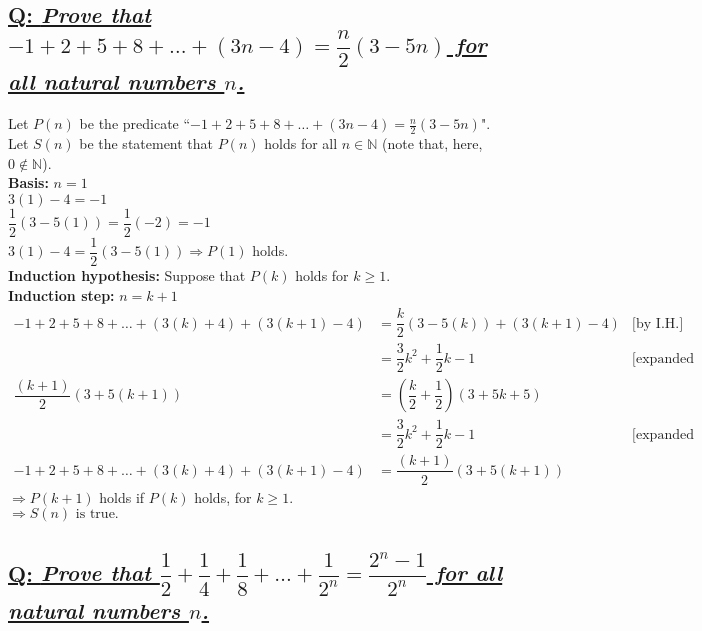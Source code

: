 \documentclass{article}
\begin{document}
\subsection*{\href{http://www.youtube.com/watch?v=wBvsIyQN4o8}{Q: {\em Prove that $-1+2+5+8+\ldots+(3n-4)=\dfrac{n}{2}(3-5n)$ for all natural numbers $n$.}}}

Let $P(n)$ be the predicate ``$-1+2+5+8+\ldots+(3n-4)=\tfrac{n}{2}(3-5n)$".\\
Let $S(n)$ be the statement that $P(n)$ holds for all $n\in\mathbb{N}$ (note that, here, $0\notin\mathbb{N}$).\\[1ex]
\textbf{Basis:} $n=1$\\[1ex]
$3(1)-4=-1$\\[1ex]
$\dfrac{1}{2}(3-5(1))=\dfrac{1}{2}(-2)=-1$\\[1ex]
$3(1)-4=\dfrac{1}{2}(3-5(1))\Rightarrow P(1)$ holds.\\[1ex]
\textbf{Induction hypothesis:} Suppose that $P(k)$ holds for $k\geq 1$.\\[1ex]
\textbf{Induction step:} $n=k+1$
\begin{align*}
-1+2+5+8+\ldots+(3(k)+4)+(3(k+1)-4)& =\dfrac{k}{2}(3-5(k))+(3(k+1)-4)& \text{[by I.H.]}\\
& =\dfrac{3}{2}k^2+\dfrac{1}{2}k-1& \text{[expanded and simplified]}\\
\dfrac{(k+1)}{2}(3+5(k+1))& =\left(\dfrac{k}{2}+\dfrac{1}{2}\right)(3+5k+5)\\
& =\dfrac{3}{2}k^2+\dfrac{1}{2}k-1& \text{[expanded and simplified]}\\
-1+2+5+8+\ldots+(3(k)+4)+(3(k+1)-4)& =\dfrac{(k+1)}{2}(3+5(k+1))
\end{align*}
$\Rightarrow P(k+1)$ holds if $P(k)$ holds, for $k\geq 1$.\\[1ex]
$\boxed{\Rightarrow S(n)\text{ is true.}}$

\subsection*{\href{http://www.youtube.com/watch?v=uHfwNKWyD20}{Q: {\em Prove that $\dfrac{1}{2}+\dfrac{1}{4}+\dfrac{1}{8}+\ldots+\dfrac{1}{2^n}=\dfrac{2^n-1}{2^n}$ for all natural numbers $n$.}}}
\end{document}
